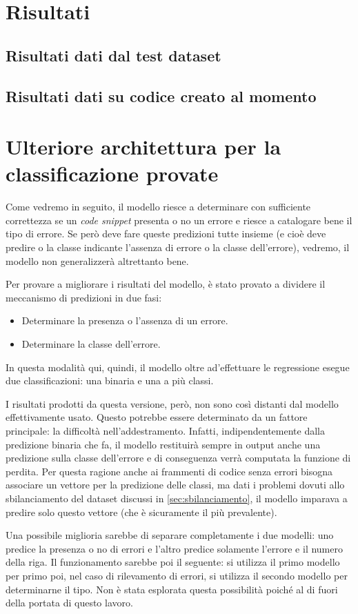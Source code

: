 \section{Risultati}
\subsection{Risultati dati dal test dataset}
\subsection{Risultati dati su codice creato al momento}



\section{Ulteriore architettura per la classificazione provate}
Come vedremo in seguito, il modello riesce a determinare con sufficiente correttezza se un \textit{code snippet} presenta o no un errore e riesce a catalogare bene il tipo di errore.
Se però deve fare queste predizioni tutte insieme (e cioè deve predire o la classe indicante l'assenza di errore o la classe dell'errore), vedremo, il modello non generalizzerà altrettanto bene.

Per provare a migliorare i risultati del modello, è stato provato a dividere il meccanismo di predizioni in due fasi:
    \begin{itemize}
        \item Determinare la presenza o l'assenza di un errore.
        \item Determinare la classe dell'errore.
    \end{itemize}
In questa modalità qui, quindi, il modello oltre ad'effettuare le regressione esegue due classificazioni: una binaria e una a più classi.

I risultati prodotti da questa versione, però, non sono così distanti dal modello effettivamente usato.
Questo potrebbe essere determinato da un fattore principale: la difficoltà nell'addestramento. 
Infatti, indipendentemente dalla predizione binaria che fa, il modello restituirà sempre in output anche una predizione sulla classe dell'errore e di conseguenza verrà computata la funzione di perdita.
Per questa ragione anche ai frammenti di codice senza errori bisogna associare un vettore per la predizione delle classi, ma dati i problemi dovuti allo sbilanciamento del dataset discussi in \autoref{sec:sbilanciamento},
il modello imparava a predire solo questo vettore (che è sicuramente il più prevalente).

Una possibile miglioria sarebbe di separare completamente i due modelli: uno predice la presenza o no di errori e l'altro predice solamente l'errore e il numero della riga.
Il funzionamento sarebbe poi il seguente: si utilizza il primo modello per primo poi, nel caso di rilevamento di errori, si utilizza il secondo modello per determinarne il tipo.
Non è stata esplorata questa possibilità poiché al di fuori della portata di questo lavoro. 
